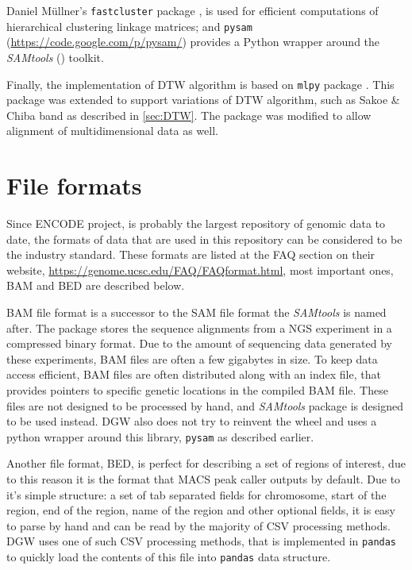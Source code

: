 \documentclass[parskip]{cs4rep}
\newcommand{\pythonpackage}[1]{{\tt #1}}
\begin{document}
Daniel M\"ullner's \pythonpackage{fastcluster} package \cite{Mullner:2011wb}, is used for efficient computations
of hierarchical clustering linkage matrices; and \pythonpackage{pysam} (\url{https://code.google.com/p/pysam/}) provides a Python wrapper around the \emph{SAMtools} (\cite{Li:2009ka}) toolkit.

Finally, the implementation of DTW algorithm is based on \pythonpackage{mlpy} package \cite{Albanese:2012vf}. This package was extended to support variations of DTW algorithm, such as Sakoe \& Chiba band as described in \autoref{sec:DTW}. The package was modified to allow alignment of multidimensional data as well.
\section{File formats}
Since ENCODE project, \cite{Rosenbloom:2011gw} is probably the largest repository of genomic data to date, the formats of data that are used in this repository can be considered to be the industry standard. These formats are listed at the FAQ section on their website, \url{https://genome.ucsc.edu/FAQ/FAQformat.html}, most important ones, BAM and BED are described below.

BAM file format is a successor to the SAM file format the \emph{SAMtools} is named after. The package stores the sequence alignments from a NGS experiment in a compressed binary format. Due to the amount of sequencing data generated by these experiments, BAM files are often a few gigabytes in size. 
To keep data access efficient, BAM files are often distributed along with an index file, that provides pointers to specific genetic locations in the compiled BAM file. These files are not designed to be processed by hand, and \emph{SAMtools} package is designed to be used instead. DGW also does not try to reinvent the wheel and uses a python wrapper around this library, \pythonpackage{pysam} as described earlier.

Another file format, BED, is perfect for describing a set of regions of interest, due to this reason it is the format that MACS peak caller outputs by default. Due to it's simple structure: a set of tab separated fields for chromosome, start of the region, end of the region, name of the region and other optional fields, it is easy to parse by hand and can be read by the majority of CSV processing methods.
DGW uses one of such CSV processing methods, that is implemented in \pythonpackage{pandas} to quickly load the contents of this file into \pythonpackage{pandas} data structure.
\end{document}
